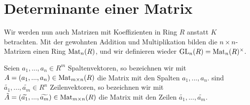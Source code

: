 \section{Determinante einer Matrix}

\begin{remark}
	Wir werden nun auch Matrizen mit Koeffizienten in Ring $R$ anstatt $K$ betrachten. Mit der gewohnten Addition und 
	Multiplikation bilden die $n\times n$-Matrizen einen Ring $\operatorname{Mat}_n(R)$, und wir definieren wieder $\operatorname{GL}_n(R)=\operatorname{Mat}_n(R)^{\times}$.
\end{remark}

\begin{remark}
	Seien $a_1,...,a_n\in R^m$ Spaltenvektoren, so bezeichnen wir mit $A=(a_1,...,a_n)\in \operatorname{Mat}_{m\times n}(R)$ die 
	Matrix mit den Spalten $a_1,...,a_n$. sind $\widetilde{a_1},...,\widetilde{a_m}\in R^n$ Zeilenvektoren, so bezeichnen wir mit $\tilde A=(
	\widetilde{a_1},...,\widetilde{a_m})\in \operatorname{Mat}_{m\times n}(R)$ die Matrix mit den Zeilen $\widetilde{a_1},...,\widetilde{a_m}$.
\end{remark}

